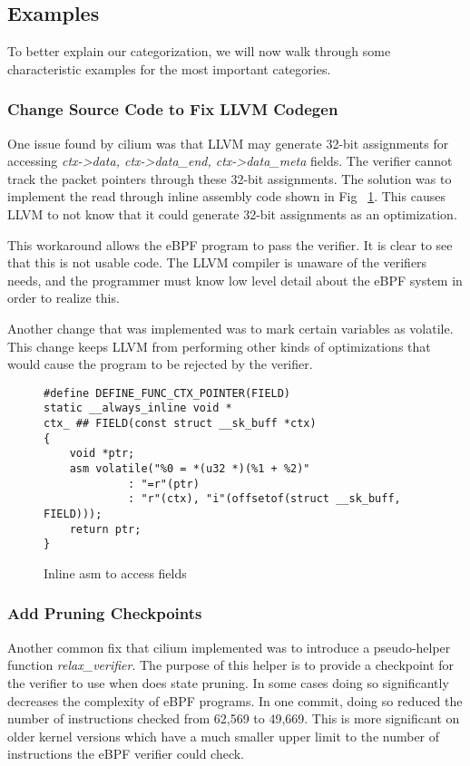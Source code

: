 \subsection{Examples}
To better explain our categorization, we will now walk through some characteristic examples for the most important categories.

\subsubsection{Change Source Code to Fix LLVM Codegen}
One issue found by cilium was that LLVM may generate 32-bit assignments for accessing \emph{ctx->data, ctx->data\_end, ctx->data\_meta} fields.
The verifier cannot track the packet pointers through these 32-bit assignments.
The solution was to implement the read through inline assembly code shown in Fig ~\ref{fig:inline-asm}.
This causes LLVM to not know that it could generate 32-bit assignments as an optimization.



This workaround allows the eBPF program to pass the verifier.
It is clear to see that this is not usable code.
The LLVM compiler is unaware of the verifiers needs, and the programmer must know low level detail about the eBPF system in order to realize this.

Another change that was implemented was to mark certain variables as volatile.
This change keeps LLVM from performing other kinds of optimizations that would cause the program to be rejected by the verifier.

\begin{figure}
    \begin{lstlisting}[language=myC]
#define DEFINE_FUNC_CTX_POINTER(FIELD)
static __always_inline void *
ctx_ ## FIELD(const struct __sk_buff *ctx)
{
	void *ptr;
	asm volatile("%0 = *(u32 *)(%1 + %2)"
		     : "=r"(ptr)
		     : "r"(ctx), "i"(offsetof(struct __sk_buff, FIELD)));
	return ptr;	
}
    \end{lstlisting}
    \caption{Inline asm to access fields}
    \label{fig:inline-asm}
\end{figure}

\subsubsection{Add Pruning Checkpoints}
Another common fix that cilium implemented was to introduce a pseudo-helper function \emph{relax\_verifier}.
The purpose of this helper is to provide a checkpoint for the verifier to use when does state pruning.
In some cases doing so significantly decreases the complexity of eBPF programs.
In one commit, doing so reduced the number of instructions checked from 62,569 to 49,669.
This is more significant on older kernel versions which have a much smaller upper limit to the number of instructions the eBPF verifier could check.


